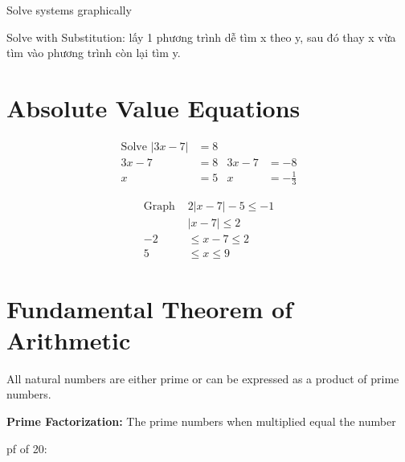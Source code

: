 Solve systems graphically

Solve with Substitution: lấy 1 phương trình dễ tìm x theo y, sau đó thay x vừa tìm vào phương trình còn lại tìm y.

\section{Absolute Value Equations}

\begin{align*}
  \text{Solve } |3x-7| &= 8\\
  3x-7&=8      &  3x-7&=-8\\
  x&=5         &  x&=-\frac{1}{3}
\end{align*}

\vspace{5mm}

\begin{align*}
  \text{Graph } &2|x-7 | -5 \leq -1\\
  &|x-7 | \leq 2\\
  -2 &\leq x-7 \leq 2\\
  5 &\leq x \leq 9
\end{align*}

\section{Fundamental Theorem of Arithmetic}

All natural numbers are either prime or can be expressed as a product of prime numbers.

\textbf{Prime Factorization:} The prime numbers when multiplied equal the number

pf of 20: \(\)

